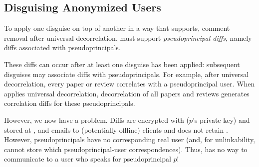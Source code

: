 \subsection{Disguising Anonymized Users}


To apply one disguise on top of another in a way that supports, \eg comment removal after universal
decorrelation, \sys must support \emph{pseudoprincipal diffs}, namely diffs associated with
pseudoprincipals. 

These diffs can occur after at least one disguise has been applied: subsequent disguises may
associate diffs with pseudoprincipals. For example, after universal decorrelation, every paper or
review correlates with a pseudoprincipal user. When \sys applies universal decorrelation,
decorrelation of all papers and reviews generates correlation diffs for these pseudoprincipals.

However, we now have a problem. Diffs are encrypted with  ($p$'s private key) and stored at
, and \sys emails  to (potentially offline) clients and does not retain
.  However, pseudoprincipals have no corresponding real user (and, for unlinkability, \sys
cannot store which pseudoprincipal-user correspondences). Thus, \sys has no way to communicate
 to a user who speaks for pseudoprincipal $p$!

